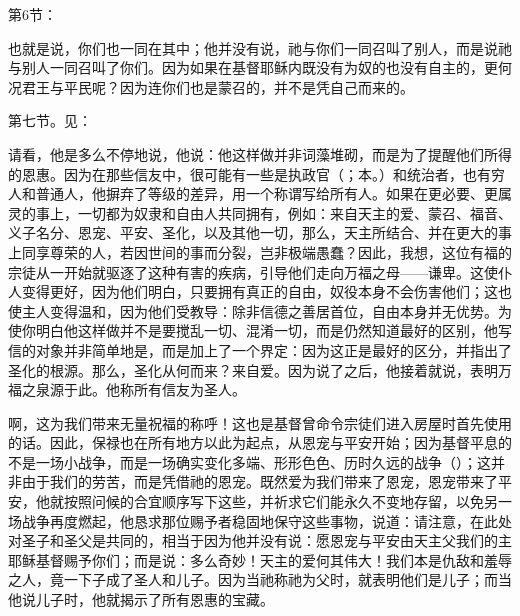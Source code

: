 第6节：\par

也就是说，你们也一同在其中；他并没有说，祂与你们一同召叫了别人，而是说祂与别人一同召叫了你们。因为如果在基督耶稣内既没有为奴的也没有自主的，更何况君王与平民呢？因为连你们也是蒙召的，并不是凭自己而来的。\par

第七节。见：\par

请看，他是多么不停地说，他说：他这样做并非词藻堆砌，而是为了提醒他们所得的恩惠。因为在那些信友中，很可能有一些是执政官（；本。）和统治者，也有穷人和普通人，他摒弃了等级的差异，用一个称谓写给所有人。如果在更必要、更属灵的事上，一切都为奴隶和自由人共同拥有，例如：来自天主的爱、蒙召、福音、义子名分、恩宠、平安、圣化，以及其他一切，那么，天主所结合、并在更大的事上同享尊荣的人，若因世间的事而分裂，岂非极端愚蠢？因此，我想，这位有福的宗徒从一开始就驱逐了这种有害的疾病，引导他们走向万福之母——谦卑。这使仆人变得更好，因为他们明白，只要拥有真正的自由，奴役本身不会伤害他们；这也使主人变得温和，因为他们受教导：除非信德之善居首位，自由本身并无优势。为使你明白他这样做并不是要搅乱一切、混淆一切，而是仍然知道最好的区别，他写信的对象并非简单地是，而是加上了一个界定：因为这正是最好的区分，并指出了圣化的根源。那么，圣化从何而来？来自爱。因为说了之后，他接着就说，表明万福之泉源于此。他称所有信友为圣人。\par

啊，这为我们带来无量祝福的称呼！这也是基督曾命令宗徒们进入房屋时首先使用的话。因此，保禄也在所有地方以此为起点，从恩宠与平安开始；因为基督平息的不是一场小战争，而是一场确实变化多端、形形色色、历时久远的战争（）；这并非由于我们的劳苦，而是凭借祂的恩宠。既然爱为我们带来了恩宠，恩宠带来了平安，他就按照问候的合宜顺序写下这些，并祈求它们能永久不变地存留，以免另一场战争再度燃起，他恳求那位赐予者稳固地保守这些事物，说道：请注意，在此处对圣子和圣父是共同的，相当于因为他并没有说：愿恩宠与平安由天主父我们的主耶稣基督赐予你们；而是说：多么奇妙！天主的爱何其伟大！我们本是仇敌和羞辱之人，竟一下子成了圣人和儿子。因为当祂称祂为父时，就表明他们是儿子；而当他说儿子时，他就揭示了所有恩惠的宝藏。\par

